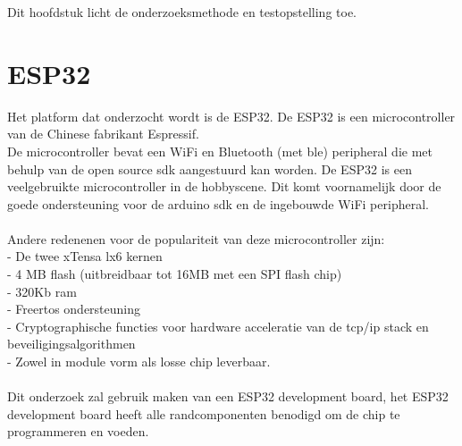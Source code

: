 \documentclass[../DCM2_Verslag.tex]{subfiles}
\begin{document}
Dit hoofdstuk licht de onderzoeksmethode en testopstelling toe. 

\section{ESP32}
Het platform dat onderzocht wordt is de ESP32. De ESP32 is een microcontroller van de Chinese fabrikant Espressif.\\ De microcontroller bevat een WiFi en Bluetooth (met ble) peripheral die met behulp van de open source sdk aangestuurd kan worden. De ESP32 is een veelgebruikte microcontroller in de hobbyscene. Dit komt voornamelijk door de goede ondersteuning voor de arduino sdk en de ingebouwde WiFi peripheral.
\\\\
Andere redenenen voor de populariteit van deze microcontroller zijn:\\
- De twee xTensa lx6 kernen\\
- 4 MB flash (uitbreidbaar tot 16MB met een SPI flash chip)\\
- 320Kb ram\\
- Freertos ondersteuning\\
- Cryptographische functies voor hardware acceleratie van de tcp/ip stack en beveiligingsalgorithmen\\
- Zowel in module vorm als losse chip leverbaar.\\\\
Dit onderzoek zal gebruik maken van een ESP32 development board, het ESP32 development board heeft alle randcomponenten benodigd om de chip te programmeren en voeden. \\
\newcommand{\sectionbreak}{\clearpage}
\end{document}
